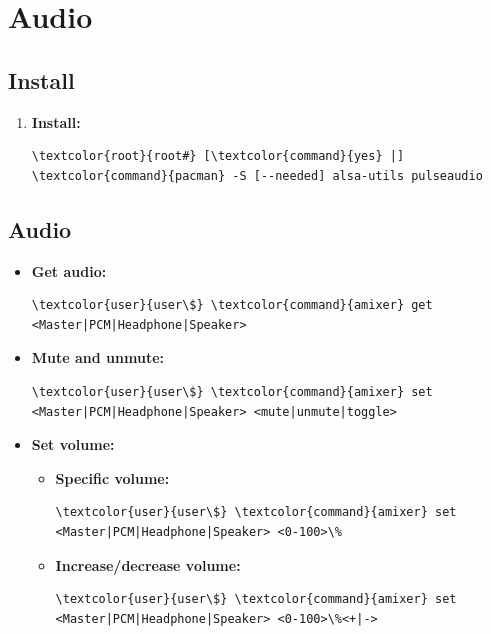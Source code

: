 \documentclass[10pt, a4paper, onecolumn, oneside, titlepage, openany]{book}
\begin{document}
\chapter{Audio}
\section{Install}
\begin{enumerate}
    \item \textbf{Install:}
\begin{Verbatim}[commandchars=\\\{\}]
\textcolor{root}{root#} [\textcolor{command}{yes} |] \textcolor{command}{pacman} -S [--needed] alsa-utils pulseaudio
\end{Verbatim}
\end{enumerate}

\section{Audio}
\begin{itemize}
    \item \textbf{Get audio:}
\begin{Verbatim}[commandchars=\\\{\}]
\textcolor{user}{user\$} \textcolor{command}{amixer} get <Master|PCM|Headphone|Speaker>
\end{Verbatim}
    \item \textbf{Mute and unmute:}
\begin{Verbatim}[commandchars=\\\{\}]
\textcolor{user}{user\$} \textcolor{command}{amixer} set <Master|PCM|Headphone|Speaker> <mute|unmute|toggle>
\end{Verbatim}
    \item \textbf{Set volume:}
    \begin{itemize}
        \item \textbf{Specific volume:}
\begin{Verbatim}[commandchars=\\\{\}]
\textcolor{user}{user\$} \textcolor{command}{amixer} set <Master|PCM|Headphone|Speaker> <0-100>\%
\end{Verbatim}        
        \item \textbf{Increase/decrease volume:}
\begin{Verbatim}[commandchars=\\\{\}]
\textcolor{user}{user\$} \textcolor{command}{amixer} set <Master|PCM|Headphone|Speaker> <0-100>\%<+|->
\end{Verbatim}   
    \end{itemize}
\end{itemize}
\end{document}
